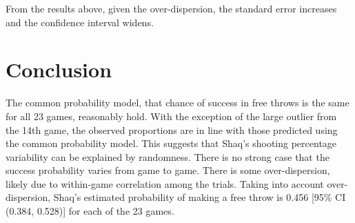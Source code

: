\documentclass[12pt, letterpaper]{article}
\begin{document}
From the results above, given the over-dispersion, the standard error increases and the confidence interval widens.  

\section{Conclusion}
The common probability model, that chance of success in free throws is the same for all 23 games, reasonably hold.  With the exception of the large outlier from the 14th game, the observed proportions are in line with those predicted using the common probability model.  This suggests that Shaq's shooting percentage variability can be explained by randomness.  There is no strong case that the success probability varies from game to game.  There is some over-dispersion, likely due to within-game correlation among the trials.  Taking into account over-dispersion, Shaq's estimated probability of making a free throw is 0.456 [95\% CI (0.384, 0.528)] for each of the 23 games.  
\end{document}
